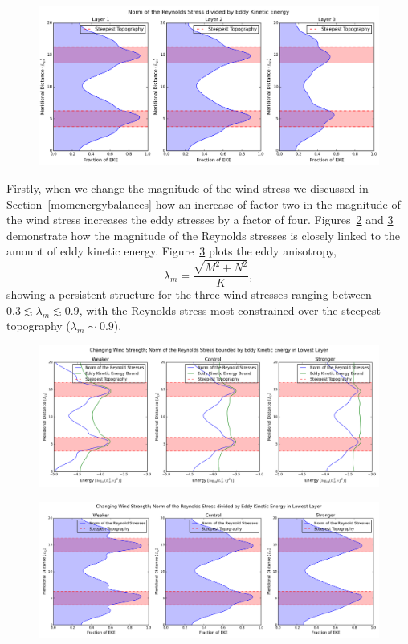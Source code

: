 \documentclass[12pt,a4paper]{report}
\newcommand*\figref[1]{Figure~\ref{#1}}
\newcommand*\secref[1]{Section~\ref{#1}}
\begin{document}
\begin{figure}
	\centering
	\includegraphics[width=\linewidth]{normovereke}
	\caption{ }
	\label{fig:normovereke}
\end{figure}

Firstly, when we change the magnitude of the wind stress we discussed in 
\secref{momenergybalances} how an increase of factor two in the magnitude of the wind stress
increases the eddy stresses by a factor of four.  Figures~\ref{fig:ekeboundwindstrength}
and \ref{fig:normoverekewindstrength}
demonstrate how the magnitude of the Reynolds stresses is closely linked to the
amount of eddy kinetic energy. \figref{fig:normoverekewindstrength} plots the
eddy anisotropy,
\begin{equation}
\lambda_{m}=\frac{\sqrt{M^{2}+N^{2}}}{K},
\end{equation}
showing a persistent structure for the three wind stresses ranging between 
$0.3 \lesssim \lambda_{m} \lesssim 0.9$, with the Reynolds stress most constrained
over the steepest topography ($\lambda_{m} \sim 0.9$).


\begin{figure}
	\centering
	\includegraphics[width=\linewidth]{ekebound_0_1}
	\caption{ }
	\label{fig:ekeboundwindstrength}
\end{figure}

\begin{figure}
	\centering
	\includegraphics[width=\linewidth]{normovereke_0_1}
	\caption{ }
	\label{fig:normoverekewindstrength}
\end{figure}
\end{document}
